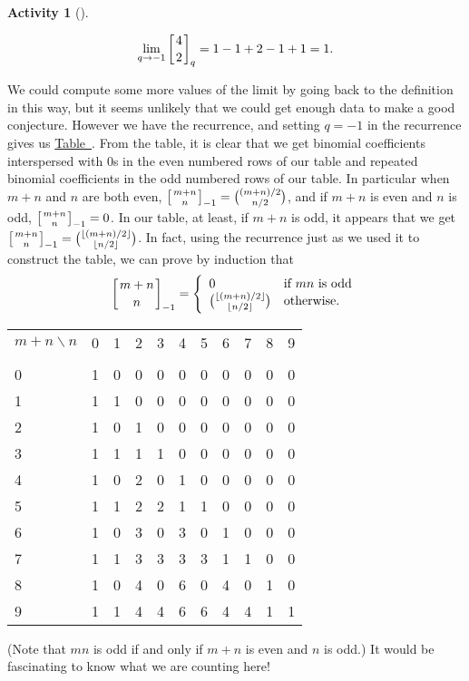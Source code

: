 \documentclass[10pt,]{book}
\theoremstyle{plain}
\theoremstyle{definition}
\newtheorem{activity}[project]{Activity}
\numberwithin{equation}{chapter}
\newcommand{\hrulethin}  {\noalign{\hrule height 0.04em}}
\newcommand{\qchoose}[2]{\left[{#1\atop#2}\right]_q}
\def\neg1choose#1#2{\left[{#1\atop#2}\right]_{-1}}
\newcommand{\amp}{&}
\begin{document}
\begin{activity}[]
\begin{enumerate}[label=(\alph*)]
\begin{equation*}
\lim_{q\rightarrow -1}\qchoose{4}{2}=1-1+2-1+1=1.
\end{equation*}
%
\par
We could compute some more values of the limit by going back to the definition in this way, but it seems unlikely that we could get enough data to make a good conjecture. However we have the recurrence, and setting \(q=-1\) in the recurrence gives us \hyperref[q-binomial-tab]{Table~}.  From the table, it is clear that we get binomial coefficients interspersed with 0s in the even numbered rows of our table and repeated binomial coefficients in the odd numbered rows of our table. In particular when \(m+n\) and \(n\) are both even, \(\neg1choose{m+n}{n}=\binom{(m+n)/2}{n/2}\), and if \(m+n\) is even and \(n\) is odd, \(\neg1choose{m+n}{n}=0\). In our table, at least, if \(m+n\) is odd, it appears that we get \(\neg1choose{m+n}{n}=\binom{\lfloor(m+n)/2\rfloor}{\lfloor n/2\rfloor}\). In fact, using the recurrence just as we used it to construct the table, we can prove by induction that%
\begin{equation*}
\neg1choose{m+n}{n}=\left\{
\begin{array}{ll}0\amp \mbox{if \(mn\) is odd} \\
\binom{\lfloor(m+n)/2\rfloor}{\lfloor n/2\rfloor}\amp \mbox{otherwise.}
\end{array} \right.
\end{equation*}
%
\begin{table}
\centering
\begin{tabular}{lllllllllll}
\(m+n\backslash n\)&0&1&2&3&4&5&6&7&8&9\tabularnewline[0pt]
&&&&&&&&&&\tabularnewline\hrulethin
0&1&0&0&0&0&0&0&0&0&0\tabularnewline[0pt]
1&1&1&0&0&0&0&0&0&0&0\tabularnewline[0pt]
2&1&0&1&0&0&0&0&0&0&0\tabularnewline[0pt]
3&1&1&1&1&0&0&0&0&0&0\tabularnewline[0pt]
4&1&0&2&0&1&0&0&0&0&0\tabularnewline[0pt]
5&1&1&2&2&1&1&0&0&0&0\tabularnewline[0pt]
6&1&0&3&0&3&0&1&0&0&0\tabularnewline[0pt]
7&1&1&3&3&3&3&1&1&0&0\tabularnewline[0pt]
8&1&0&4&0&6&0&4&0&1&0\tabularnewline[0pt]
9&1&1&4&4&6&6&4&4&1&1
\end{tabular}
\end{table}
(Note that \(mn\) is odd if and only if \(m+n\) is even and \(n\) is odd.) It would be fascinating to know what we are counting here!%

\end{enumerate}
\end{activity}
\typeout{************************************************}
\typeout{************************************************}
\end{document}
